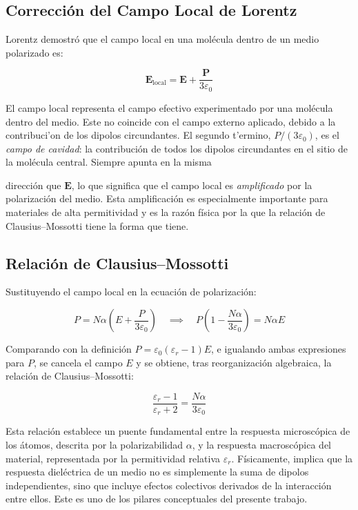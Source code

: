 \documentclass[12pt]{article}
\begin{document}
\subsection{Correcci\'on del Campo Local de Lorentz}

Lorentz demostr\'o que el campo local en una mol\'ecula dentro de un medio polarizado es:

\begin{equation}
\mathbf{E}_{\text{local}} = \mathbf{E} + \frac{\mathbf{P}}{3\varepsilon_0}
\end{equation}

El campo local representa el campo efectivo experimentado por una mol\'ecula
dentro del medio. Este no coincide con el campo externo aplicado, debido a
la contribuci'on de los dipolos circundantes. El segundo t'ermino,
$P/(3\varepsilon_0)$, es el \emph{campo de cavidad}: la contribuci\'on de
todos los dipolos circundantes en el sitio de la mol\'ecula central. Siempre apunta en la misma

direcci\'on que $\mathbf{E}$, lo que significa que el campo local es \emph{amplificado} por la
polarizaci\'on del medio. Esta amplificaci\'on es especialmente importante para materiales de
alta permitividad y es la raz\'on f\'isica por la que la relaci\'on de Clausius--Mossotti tiene la
forma que tiene.

\subsection{Relaci\'on de Clausius--Mossotti}

Sustituyendo el campo local en la ecuaci\'on de polarizaci\'on:

\begin{equation}
P = N\alpha\left(E + \frac{P}{3\varepsilon_0}\right)
\quad\implies\quad
P\!\left(1 - \frac{N\alpha}{3\varepsilon_0}\right) = N\alpha E
\end{equation}

Comparando con la definici\'on $P = \varepsilon_0(\varepsilon_r - 1)E$, e igualando
ambas expresiones para $P$, se cancela el campo $E$ y se obtiene, tras
reorganizaci\'on algebraica, la relaci\'on de Clausius--Mossotti:

\begin{equation}
\boxed{
\frac{\varepsilon_r - 1}{\varepsilon_r + 2} = \frac{N\alpha}{3\varepsilon_0}
}
\label{eq:CM}
\end{equation}

Esta relaci\'on establece un puente fundamental entre la respuesta microsc\'opica de
los \'atomos, descrita por la polarizabilidad $\alpha$, y la respuesta macrosc\'opica
del material, representada por la permitividad relativa $\varepsilon_r$. F\'isicamente,
implica que la respuesta diel\'ectrica de un medio no es simplemente la suma de
dipolos independientes, sino que incluye efectos colectivos derivados de la
interacci\'on entre ellos. Este es uno de los pilares conceptuales del presente trabajo.
\end{document}
